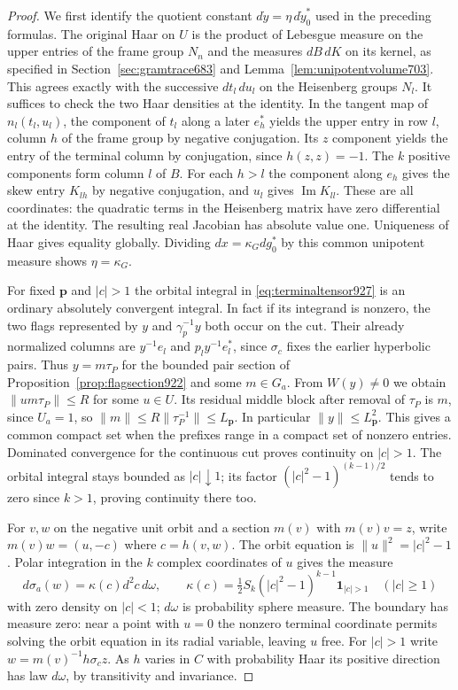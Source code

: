 \documentclass[a4paper,11pt]{article}
\theoremstyle{definition}
\theoremstyle{remark}
\numberwithin{equation}{section}
\begin{document}
\begin{proof}
We first identify the quotient constant
\(d\dot y=\eta\,d\dot y_0^*\) used in the preceding formulas.
The original Haar on \(U\) is the product of Lebesgue measure on
the upper entries of the frame group \(N_n\) and the measures
\(dB\,dK\) on its kernel, as specified in
Section~\ref{sec:gramtrace683} and Lemma~\ref{lem:unipotentvolume703}.
This agrees exactly with the successive \(dt_l\,du_l\) on the
Heisenberg groups \(N_l\). It suffices to check the two Haar
densities at the identity. In the tangent map of \(n_l(t_l,u_l)\),
the component of \(t_l\) along a later \(e_h^*\) yields the
upper entry in row \(l\), column \(h\) of the frame group by
negative conjugation. Its \(z\) component yields the entry of the
terminal column by conjugation, since \(h(z,z)=-1\).
The \(k\) positive components form column \(l\) of \(B\).
For each \(h>l\) the component along \(e_h\) gives the skew
entry \(K_{lh}\) by negative conjugation, and \(u_l\) gives
\(\operatorname{Im} K_{ll}\). These are all coordinates:
the quadratic terms in the Heisenberg matrix have zero
differential at the identity. The resulting real Jacobian has
absolute value one. Uniqueness of Haar gives equality globally.
Dividing \(dx=\kappa_G dg_0^*\) by this common unipotent
measure shows \(\eta=\kappa_G\).

For fixed \(\mathbf p\) and \(|c|>1\) the orbital integral in
\eqref{eq:terminaltensor927} is an ordinary absolutely convergent
integral. In fact if its integrand is nonzero, the two flags
represented by \(y\) and \(\gamma_p^{-1}y\) both occur on the
cut. Their already normalized columns are \(y^{-1}e_l\) and
\(p_l y^{-1}e_l^*\), since \(\sigma_c\) fixes the earlier
hyperbolic pairs. Thus \(y=m\tau_P\) for the bounded pair
section of Proposition~\ref{prop:flagsection922} and some
\(m\in G_a\). From \(W(y)\ne0\) we obtain
\(\|u m\tau_P\|\le R\) for some \(u\in U\). Its residual
middle block after removal of \(\tau_P\) is \(m\), since
\(U_a=1\), so \(\|m\|\le R\|\tau_P^{-1}\|\le L_{\mathbf p}\).
In particular \(\|y\|\le L_{\mathbf p}^2\). This gives a
common compact set when the prefixes range in a compact set
of nonzero entries. Dominated convergence for the continuous
cut proves continuity on \(|c|>1\). The orbital integral stays
bounded as \(|c|\downarrow1\); its factor
\((|c|^2-1)^{(k-1)/2}\) tends to zero since \(k>1\), proving
continuity there too.

For \(v,w\) on the negative unit orbit and a section \(m(v)\)
with \(m(v)v=z\), write \(m(v)w=(u,-c)\) where \(c=h(v,w)\).
The orbit equation is \(\|u\|^2=|c|^2-1\). Polar integration
in the \(k\) complex coordinates of \(u\) gives the measure
\[
  d\sigma_a(w)=\kappa(c)d^2c\,d\omega,\qquad
  \kappa(c)=\tfrac12 S_k (|c|^2-1)^{k-1}{\boldsymbol 1}_{|c|>1}
                         \quad (|c|\ge1)
\]
with zero density on \(|c|<1\); \(d\omega\) is probability
sphere measure. The boundary has measure zero: near a point
with \(u=0\) the nonzero terminal coordinate permits solving
the orbit equation in its radial variable, leaving \(u\) free.
For \(|c|>1\) write \(w=m(v)^{-1}h\sigma_c z\). As \(h\)
varies in \(C\) with probability Haar its positive direction
has law \(d\omega\), by transitivity and invariance.


\end{proof}
\end{document}
